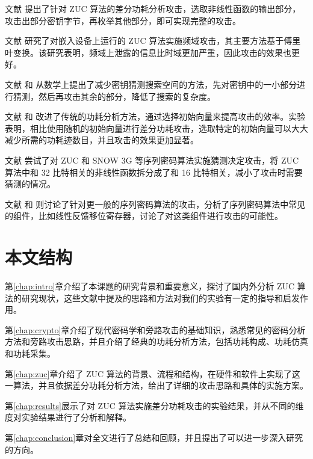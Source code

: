 文献 \parencite{zuc_attack_tangming} 提出了针对 ZUC 算法的差分功耗分析攻击，选取非线性函数的输出部分，攻击出部分密钥字节，再枚举其他部分，即可实现完整的攻击。

文献 \parencite{zuc_freq} 研究了对嵌入设备上运行的 ZUC 算法实施频域攻击，其主要方法基于傅里叶变换。该研究表明，频域上泄露的信息比时域更加严重，因此攻击的效果也更好。

文献 \parencite{zuc_security} 和 \parencite{zuc_analyical} 从数学上提出了减少密钥猜测搜索空间的方法，先对密钥中的一小部分进行猜测，然后再攻击其余的部分，降低了搜索的复杂度。

文献 \parencite{zuc_iv} 和 \parencite{zuc_wu}改进了传统的功耗分析方法，通过选择初始向量来提高攻击的效率。实验表明，相比使用随机的初始向量进行差分功耗攻击，选取特定的初始向量可以大大减少所需的功耗迹数目，并且攻击的效果更加显著。

文献 \parencite{zuc_guess} 尝试了对 ZUC 和 SNOW 3G 等序列密码算法实施猜测决定攻击，将 ZUC 算法中和 32 比特相关的非线性函数拆分成了和 16 比特相关，减小了攻击时需要猜测的情况。

文献 \parencite{stream_fischer} 和 \parencite{stream_gu} 则讨论了针对更一般的序列密码算法的攻击，分析了序列密码算法中常见的组件，比如线性反馈移位寄存器，讨论了对这类组件进行攻击的可能性。

\section{本文结构}

第\ref{chap:intro}章介绍了本课题的研究背景和重要意义，探讨了国内外分析 ZUC 算法的研究现状，这些文献中提及的思路和方法对我们的实验有一定的指导和启发作用。

第\ref{chap:crypto}章介绍了现代密码学和旁路攻击的基础知识，熟悉常见的密码分析方法和旁路攻击思路，并且介绍了经典的功耗分析方法，包括功耗构成、功耗仿真和功耗采集。

第\ref{chap:zuc}章介绍了 ZUC 算法的背景、流程和结构，在硬件和软件上实现了这一算法，并且依据差分功耗分析方法，给出了详细的攻击思路和具体的实施方案。

第\ref{chap:results}展示了对 ZUC 算法实施差分功耗攻击的实验结果，并从不同的维度对实验结果进行了分析和解释。

第\ref{chap:conclusion}章对全文进行了总结和回顾，并且提出了可以进一步深入研究的方向。


